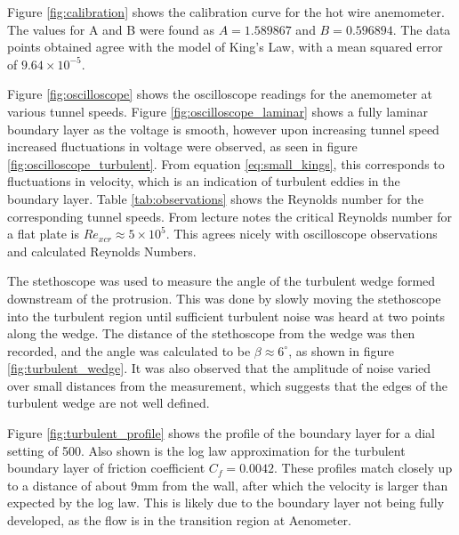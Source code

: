 \documentclass{article}
\begin{document}

Figure \ref{fig:calibration} shows the calibration curve for the hot wire anemometer.
The values for A and B were found as $A	= 1.589867$ and $B	= 0.596894$.
The data points obtained agree with the model of King's Law, with a mean squared error of $9.64\times 10^{-5}$.


Figure \ref{fig:oscilloscope} shows the oscilloscope readings for the anemometer at various tunnel speeds.
Figure \ref{fig:oscilloscope_laminar} shows a fully laminar boundary layer as the voltage is smooth, 
however upon increasing tunnel speed increased fluctuations in voltage were observed, as seen in figure \ref{fig:oscilloscope_turbulent}.
From equation \ref{eq:small_kings}, this corresponds to fluctuations in velocity, which is an indication of turbulent eddies in the boundary layer.
Table \ref{tab:observations} shows the Reynolds number for the corresponding tunnel speeds.
From lecture notes the critical Reynolds number for a flat plate is $Re_{xcr} \approx 5 \times 10^5$.
This agrees nicely with oscilloscope observations and calculated Reynolds Numbers.

The stethoscope was used to measure the angle of the turbulent wedge formed downstream of the protrusion.
This was done by slowly moving the stethoscope into the turbulent region until sufficient turbulent noise was heard at two points along the wedge.
The distance of the stethoscope from the wedge was then recorded, and the angle was calculated to be $\beta \approx 6^\circ$, as shown in figure \ref{fig:turbulent_wedge}.
It was also observed that the amplitude of noise varied over small distances from the measurement, which suggests that the edges of the turbulent wedge
are not well defined.


Figure \ref{fig:turbulent_profile} shows the profile of the boundary layer for a dial setting of 500.
Also shown is the log law approximation for the turbulent boundary layer of friction coefficient $C_f = 0.0042$.
These profiles match closely up to a distance of about 9mm from the wall, after which the velocity is larger than expected by the log law.
This is likely due to the boundary layer not being fully developed, as the flow is in the transition region at Aenometer.
\end{document}
